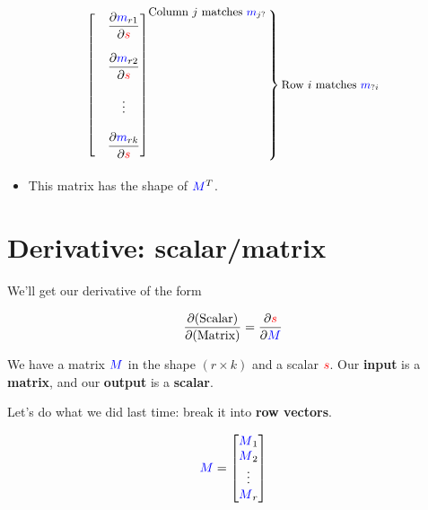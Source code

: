 \begin{definition}
\begin{equation*}
{\begin{bmatrix}
                        &
                        \begin{matrix}
                            \bigpderiv{ \blu{m}_{r1} }   { \red{s} }\\ 
                            \\
                            \bigpderiv{ \blu{m}_{r2} }   { \red{s} }\\ 
                            \\
                            \vdots \\ 
                            \\
                            \bigpderiv{ \blu{m}_{rk} }   { \red{s} }
                        \end{matrix}
                    \end{bmatrix}
                }^{ \text{\small Column $j$ matches $\blu{m}_{j?}$} }
                \bigggrB{125pt} \text{\small Row $i$ matches $\blu{m}_{?i}$} 
            \end{equation*}


            \begin{itemize}
                \item This matrix has the shape of $\textcolor{blue}{M}^T$.
            \end{itemize}
            
        \end{definition}
    
    \secdiv

\pagebreak
\section{Derivative: scalar/matrix}
    
        We'll get our derivative of the form 
        
        \begin{equation}
            \frac{\partial  \text{(Scalar)} }{\partial  \text{(Matrix)} } 
            =
            \frac{\partial  \textcolor{red}{s} }{\partial  \textcolor{blue}{M} } 
        \end{equation}
        
        We have a matrix $\textcolor{blue}{M}$ in the shape $(r \times k)$ and a scalar $\textcolor{red}{s}$. Our \textbf{input} is a \textbf{matrix}, and our \textbf{output} is a \textbf{scalar}.
        
        Let's do what we did last time: break it into \textbf{row vectors}.
        
        \begin{equation}
            \textcolor{blue}{M}
            =
            \begin{bmatrix}
                \textcolor{blue}{M}_1 \\ \textcolor{blue}{M}_2 \\ \vdots \\ \textcolor{blue}{M}_r
            \end{bmatrix}
        \end{equation}
        
